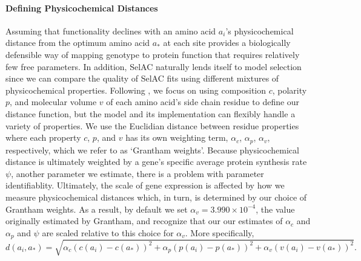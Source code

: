 \documentclass{article}
\newcommand{\selac}{SelAC\xspace}
\newcommand{\alphac}{\ensuremath{\alpha_c}\xspace}
\newcommand{\alphap}{\ensuremath{\alpha_p}\xspace}
\newcommand{\alphav}{\ensuremath{\alpha_v}\xspace}
\newcommand{\aopt}{\ensuremath{a_*}\xspace}
\begin{document}
\paragraph*{Defining Physicochemical Distances}
Assuming that functionality declines with an amino acid $a_i$'s physicochemical distance from the optimum amino acid \aopt at each site provides a biologically defensible way of mapping genotype to protein function that requires relatively few free parameters.
In addition, \selac naturally lends itself to model selection since we can compare the quality of \selac fits using different mixtures of physicochemical properties.
Following \cite{Grantham1974}, we focus on using composition $c$, polarity $p$, and molecular volume $v$ of each amino acid's side chain residue to define our distance function, but the model and its implementation can flexibly handle a variety of properties.
We use the Euclidian distance between residue properties where each property $c$, $p$, and $v$ has its own weighting term, $\alphac$, $\alphap$, $\alphav$, respectively, which we refer to as `Grantham weights'.
Because physicochemical distance is ultimately weighted by a gene's specific average protein synthesis rate $\psi$, another parameter we estimate, there is a problem with parameter identifiablity.
Ultimately, the scale of gene expression is affected by how we measure physicochemical distances which, in turn, is determined by our choice of Grantham weights.
As a result, by default we set $\alphav = 3.990 \times 10^{-4}$, the value originally estimated by Grantham, and recognize that our our estimates of $\alphac$ and $\alphap$ and $\psi$ are scaled relative to this choice for $\alphav$.
More specifically,
\begin{equation*}
  d(a_i, \aopt) = \sqrt{\alphac \left(c\left(a_i\right) - c\left(\aopt\right)\right)^2 + \alphap \left(p\left(a_i\right) - p\left(\aopt\right)\right)^2 +  \alphav \left(v\left(a_i\right) - v\left(\aopt\right)\right)^2}.
\end{equation*}
\end{document}
